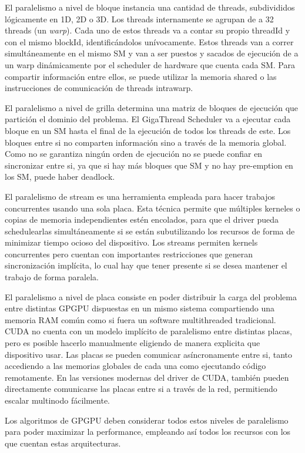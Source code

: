 El paralelismo a nivel de bloque instancia una cantidad de threads, subdivididos l\'ogicamente en 1D, 2D o 3D.
Los threads internamente se agrupan de a 32 threads (un \textit{warp}).
Cada uno de estos threads va a contar su propio threadId y con el mismo blockId, identific\'andolos un\'ivocamente.
Estos threads van a correr simult\'aneamente en el mismo SM y van a ser puestos y sacados de ejecuci\'on de a un warp
din\'amicamente por el scheduler de hardware que cuenta cada SM. Para compartir informaci\'on entre
ellos, se puede utilizar la memoria shared o las instrucciones de comunicaci\'on de threads intrawarp.

El paralelismo a nivel de grilla determina una matriz de bloques de ejecuci\'on que partici\'on
el dominio del problema. El GigaThread Scheduler va a ejecutar cada bloque en un SM hasta
el final de la ejecuci\'on de todos los threads de este. Los bloques entre si no comparten informaci\'on
sino a trav\'es de la memoria global. Como no se garantiza ning\'un orden de ejecuci\'on no se puede
confiar en sincronizar entre si, ya que si hay m\'as bloques que SM y no hay pre-emption en los SM,
puede haber deadlock.

El paralelismo de stream es una herramienta empleada para hacer trabajos concurrentes usando una
sola placa. Esta t\'ecnica permite que m\'ultiples kerneles o copias de memoria independientes est\'en
encolados, para que el driver pueda schedulearlas simult\'aneamente si se est\'an subutilizando
los recursos de forma de minimizar tiempo ocioso del dispositivo. Los streams permiten kernels
concurrentes pero cuentan con importantes restricciones que generan sincronizaci\'on impl\'icita,
lo cual hay que tener presente si se desea mantener el trabajo de forma paralela.

El paralelismo a nivel de placa consiste en poder distribuir la carga del problema entre distintas
GPGPU dispuestas en un mismo sistema compartiendo una memoria RAM com\'un como si fuera un software
multithreaded tradicional. CUDA no cuenta con un modelo impl\'icito de paralelismo entre distintas placas,
pero es posible hacerlo manualmente eligiendo de manera explicita que dispositivo usar. Las placas
se pueden comunicar as\'incronamente entre si, tanto accediendo a las memorias globales de cada una
como ejecutando c\'odigo remotamente. En las versiones modernas del driver de CUDA, tambi\'en pueden
directamente comunicarse las placas entre si a trav\'es de la red, permitiendo escalar multinodo f\'acilmente.

Los algoritmos de GPGPU deben considerar todos estos niveles de paralelismo para poder maximizar la
performance, empleando as\'i todos los recursos con los que cuentan estas arquitecturas.

